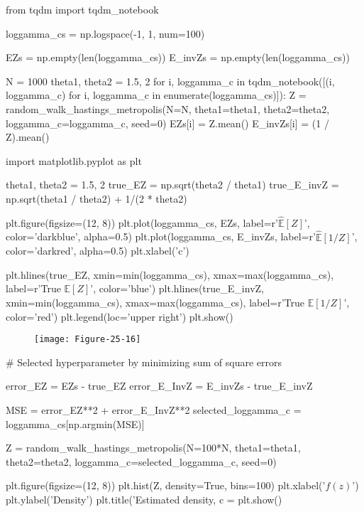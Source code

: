\begin{python}
from tqdm import tqdm_notebook

loggamma_cs = np.logspace(-1, 1, num=100)

EZs = np.empty(len(loggamma_cs))
E_invZs = np.empty(len(loggamma_cs))

N = 1000
theta1, theta2 = 1.5, 2
for i, loggamma_c in tqdm_notebook([(i, loggamma_c) for i, loggamma_c in enumerate(loggamma_cs)]):
    Z = random_walk_hastings_metropolis(N=N, theta1=theta1, theta2=theta2, loggamma_c=loggamma_c, seed=0)
    EZs[i] = Z.mean()
    E_invZs[i] = (1 / Z).mean()
\end{python}

\begin{python}
import matplotlib.pyplot as plt

theta1, theta2 = 1.5, 2
true_EZ = np.sqrt(theta2 / theta1)
true_E_invZ = np.sqrt(theta1 / theta2) + 1/(2 * theta2)

plt.figure(figsize=(12, 8))
plt.plot(loggamma_cs, EZs, label=r'$\hat{\mathbb{E}}[Z]$', color='darkblue', alpha=0.5)
plt.plot(loggamma_cs, E_invZs, label=r'$\hat{\mathbb{E}}[1 / Z]$', color='darkred', alpha=0.5)
plt.xlabel('c')

plt.hlines(true_EZ, xmin=min(loggamma_cs), xmax=max(loggamma_cs), label=r'True $\mathbb{E}[Z]$', color='blue')
plt.hlines(true_E_invZ, xmin=min(loggamma_cs), xmax=max(loggamma_cs), label=r'True $\mathbb{E}[1 / Z]$', color='red')
plt.legend(loc='upper right')
plt.show()
\end{python}

\begin{figure}[H]
\texttt{[image: Figure-25-16]}
\end{figure}

\begin{python}
# Selected hyperparameter by minimizing sum of square errors

error_EZ = EZs - true_EZ
error_E_InvZ = E_invZs - true_E_invZ

MSE = error_EZ**2 + error_E_InvZ**2
selected_loggamma_c = loggamma_cs[np.argmin(MSE)]

Z = random_walk_hastings_metropolis(N=100*N, theta1=theta1, theta2=theta2, loggamma_c=selected_loggamma_c, seed=0)
\end{python}

\begin{python}
plt.figure(figsize=(12, 8))
plt.hist(Z, density=True, bins=100)
plt.xlabel('$f(z)$')
plt.ylabel('Density')
plt.title('Estimated density, c = %
plt.show()
\end{python}

